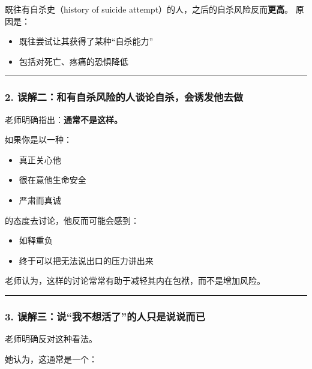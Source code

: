 \documentclass[
  chinese,
  9pt,
  a4paper,
]{ctexart}
\providecommand{\tightlist}{%
  \setlength{\itemsep}{0pt}\setlength{\parskip}{0pt}}
\begin{document}
既往有自杀史（history of suicide
attempt）的人，之后的自杀风险反而\textbf{更高}。 原因是：

\begin{itemize}
\tightlist
\item
  既往尝试让其获得了某种``自杀能力''
\item
  包括对死亡、疼痛的恐惧降低
\end{itemize}

\begin{center}\rule{0.5\linewidth}{0.5pt}\end{center}

\subsubsection{2.
误解二：和有自杀风险的人谈论自杀，会诱发他去做}\label{ux8befux89e3ux4e8cux548cux6709ux81eaux6740ux98ceux9669ux7684ux4ebaux8c08ux8bbaux81eaux6740ux4f1aux8bf1ux53d1ux4ed6ux53bbux505a}

老师明确指出：\textbf{通常不是这样。}

如果你是以一种：

\begin{itemize}
\tightlist
\item
  真正关心他
\item
  很在意他生命安全
\item
  严肃而真诚
\end{itemize}

的态度去讨论，他反而可能会感到：

\begin{itemize}
\tightlist
\item
  如释重负
\item
  终于可以把无法说出口的压力讲出来
\end{itemize}

老师认为，这样的讨论常常有助于减轻其内在包袱，而不是增加风险。

\begin{center}\rule{0.5\linewidth}{0.5pt}\end{center}

\subsubsection{3.
误解三：说``我不想活了''的人只是说说而已}\label{ux8befux89e3ux4e09ux8bf4ux6211ux4e0dux60f3ux6d3bux4e86ux7684ux4ebaux53eaux662fux8bf4ux8bf4ux800cux5df2}

老师明确反对这种看法。

她认为，这通常是一个：
\end{document}
